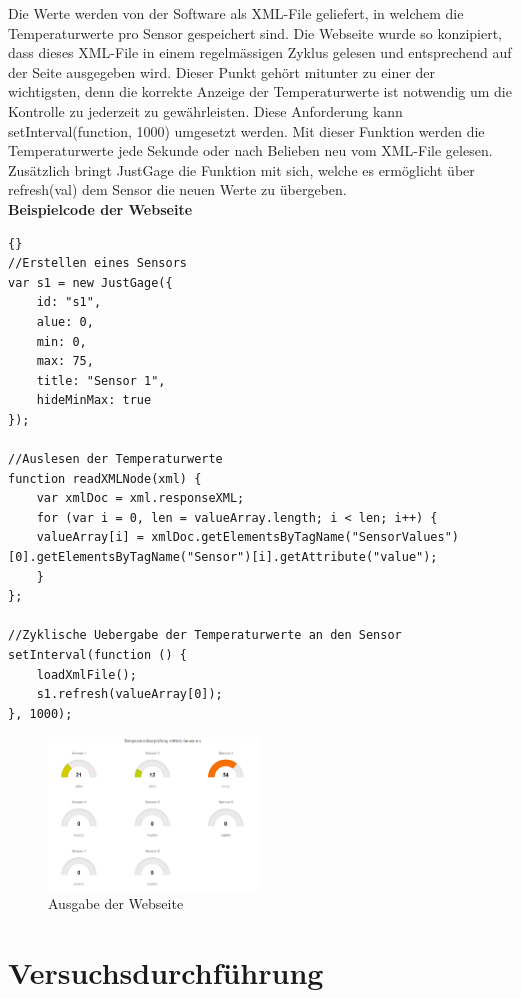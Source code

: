 Die Werte werden von der Software als XML-File geliefert, in welchem die Temperaturwerte pro Sensor gespeichert sind. Die Webseite wurde so konzipiert, dass dieses XML-File in einem regelmässigen Zyklus gelesen und entsprechend auf der Seite ausgegeben wird. Dieser Punkt gehört mitunter zu einer der wichtigsten, denn die korrekte Anzeige der Temperaturwerte ist notwendig um die Kontrolle zu jederzeit zu gewährleisten. Diese Anforderung kann setInterval(function, 1000) umgesetzt werden. Mit dieser Funktion werden die Temperaturwerte jede Sekunde oder nach Belieben neu vom XML-File gelesen.
Zusätzlich bringt JustGage die Funktion mit sich, welche es ermöglicht über refresh(val) dem Sensor die neuen Werte zu übergeben.\\


\textbf{Beispielcode der Webseite}

\begin{lstlisting}{}
//Erstellen eines Sensors
var s1 = new JustGage({
	id: "s1",
	alue: 0,
    min: 0,
    max: 75,
    title: "Sensor 1",
    hideMinMax: true
});

//Auslesen der Temperaturwerte
function readXMLNode(xml) {
	var xmlDoc = xml.responseXML;
	for (var i = 0, len = valueArray.length; i < len; i++) {
	valueArray[i] = xmlDoc.getElementsByTagName("SensorValues")[0].getElementsByTagName("Sensor")[i].getAttribute("value");
	}
};

//Zyklische Uebergabe der Temperaturwerte an den Sensor
setInterval(function () {
	loadXmlFile();
	s1.refresh(valueArray[0]);
}, 1000);
\end{lstlisting}

\begin{figure}[H]%
\centering
\includegraphics[width=0.5\textwidth]{Images/Webseite.png}
\caption{Ausgabe der Webseite}
\label{fig:webpage}
\end{figure}

\section{Versuchsdurchführung}
